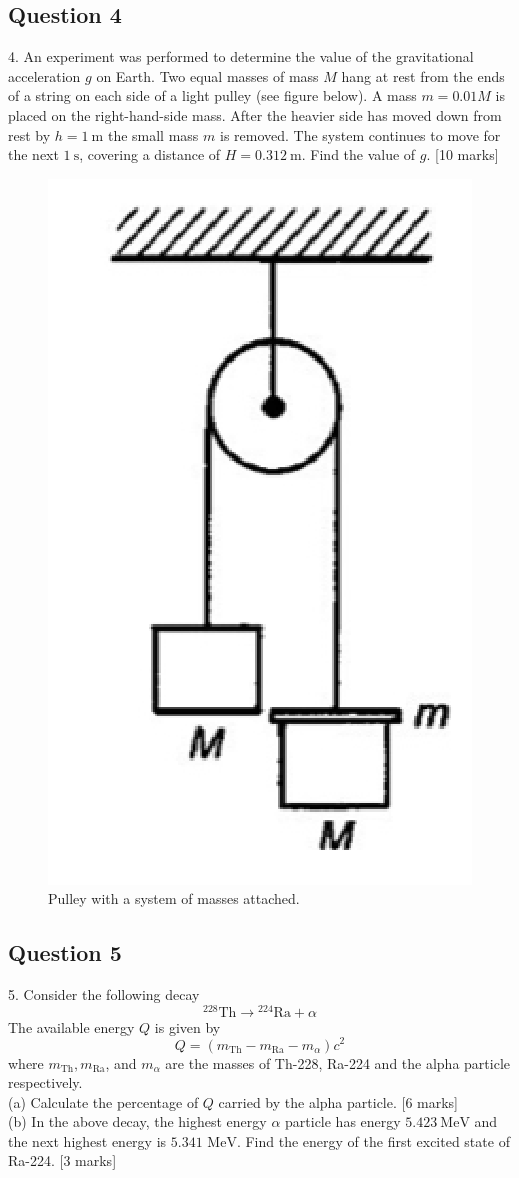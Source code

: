 \documentclass{article}
\begin{document}
\subsection{Question 4}
4. An experiment was performed to determine the value of the gravitational acceleration $g$ on Earth. Two equal masses of mass $M$ hang at rest from the ends of a string on each side of a light pulley (see figure below). A mass $m=0.01 M$ is placed on the right-hand-side mass. After the heavier side has moved down from rest by $h=1 \mathrm{~m}$ the small mass $m$ is removed. The system continues to move for the next $1 \mathrm{~s}$, covering a distance of $H=0.312 \mathrm{~m} .$ Find the value of $g$. [10 marks]
\begin{figure}
	\centering
	\includegraphics[width=0.5\linewidth]{spho_book_TYS_images/2016q4.png}
	\caption{Pulley with a system of masses attached.}
\end{figure}

\subsection{Question 5}
5. Consider the following decay
$$
{ }^{228} \mathrm{Th} \rightarrow{ }^{224} \mathrm{Ra}+\alpha
$$
The available energy $Q$ is given by
$$
Q=\left(m_{\mathrm{Th}}-m_{\mathrm{Ra}}-m_{\alpha}\right) c^{2}
$$
where $m_{\mathrm{Th}}, m_{\mathrm{Ra}}$, and $m_{\alpha}$ are the masses of Th-228, Ra-224 and the alpha particle respectively. \\
(a) Calculate the percentage of $Q$ carried by the alpha particle. [6 marks] \\
(b) In the above decay, the highest energy $\alpha$ particle has energy $5.423 \mathrm{~MeV}$ and the next highest energy is $5.341$ $\mathrm{MeV}$. Find the energy of the first excited state of Ra-224. [3 marks]
\end{document}
